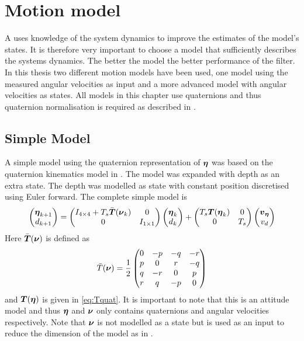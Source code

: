 \section{Motion model}
A \abbrKF uses knowledge of the system dynamics to improve the estimates of the model's states. It is therefore very important to choose a model that sufficiently describes the systems dynamics. The better the model the better performance of the filter. In this thesis two different motion models have been used, one model using the measured angular velocities as input and a more advanced model with angular velocities as states. All models in this chapter use quaternions and thus quaternion normalisation is required as described in .

\subsection{Simple Model}\label{sec:simple_model}
A simple model using the quaternion representation of $\boldsymbol{\eta}$ was based on the quaternion kinematics model in \citet[p.47]{Tornqvist}. The model was expanded with depth as an extra state. The depth was modelled as state with constant position discretised using Euler forward. The complete simple model is 
\begin{equation}
\begin{pmatrix}
\boldsymbol{\eta}_{k+1}\\
d_{k+1}
\end{pmatrix} 
=
 \begin{pmatrix}
 I_{4\times4} + T_s \bar{\boldsymbol{T}}(\boldsymbol{\nu}_k) & 0\\
 0 & I_{1\times1} 
 \end{pmatrix}
 \begin{pmatrix}
 \boldsymbol{\eta}_{k}\\
 d_k
 \end{pmatrix}
 +
  \begin{pmatrix}
  T_s \boldsymbol{T}(\boldsymbol{\eta}_{k}) & 0\\
  0 & T_s
  \end{pmatrix}
  \begin{pmatrix}
  \boldsymbol{v}_{\boldsymbol{\eta}}\\
  v_d 
  \end{pmatrix}
\end{equation}
Here $\bar{\boldsymbol{T}}(\boldsymbol{\nu})$ is defined as
\begin{equation}
\bar{T}(\boldsymbol{\nu}) = \frac{1}{2}
\begin{pmatrix}
     0 &-p &-q &-r\\
     p & 0 & r &-q\\
     q &-r & 0 & p\\
     r & q &-p & 0
\end{pmatrix}
\end{equation} and $\boldsymbol{T}(\boldsymbol{\eta})$ is given in \eqref{eq:Tquat}.
It is important to note that this is an attitude model and thus $\boldsymbol{\eta}$ and $\boldsymbol{\nu}$ only contains quaternions and angular velocities respectively. Note that $\boldsymbol{\nu}$ is not modelled as a state but is used as an input to reduce the dimension of the model as in \citet{Tornqvist}. 
